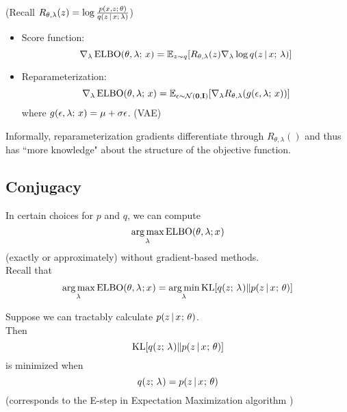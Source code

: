 \begin{frame}
(Recall $R_{\theta, \lambda}(z) = \log \frac{p(x,z ; \, \theta)}{q(z \,|\, x ; \, \lambda)}$)
\begin{itemize}
\item Score function:
\[
    \nabla_\lambda \operatorname*{ELBO}(\theta, \lambda ; \, x) = \mathbb{E}_{z \sim q}[R_{\theta, \lambda}(z) \nabla_\lambda \log q(z \,|\,  x  ; \, \lambda)]
    \]
    \item Reparameterization:
\[
    \nabla_\lambda \operatorname*{ELBO}(\theta, \lambda ; \, x)  = \mathbb{E}_{\epsilon \sim \mathcal{N}(\mathbf{0}, \mathbf{I})}[\nabla_\lambda R_{\theta, \lambda}(g(\epsilon, \lambda ; \, x))]
\]
    where $g(\epsilon, \lambda ; \, x) = \mu + \sigma \epsilon$. (VAE)
\end{itemize}
Informally, reparameterization gradients differentiate through $R_{\theta, \lambda}()$ and thus has ``more knowledge"
about the structure of the objective function.
\end{frame}

\subsection{Conjugacy}


\begin{frame}
In certain choices for $p$ and $q$, we can compute 
\[ \argmax_\lambda \ELBO(\theta, \lambda; x^{}) \]
(exactly or approximately) without gradient-based methods. \\
\air 
\pause
Recall that 
\begin{align*}
     \argmax_{\lambda^{}} \ELBO(\theta, \lambda^{}; x^{}) =   \argmin_{\lambda^{}}  \KL[q(z  \param \lambda^{}) \Vert p(z \given x^{} \param \theta)] 
\end{align*}

\end{frame}

\begin{frame}
Suppose we can tractably calculate $p(z \,|\, x^{} ; \, \theta)$. \\
\pause
Then 
\[  \operatorname*{KL}[q(z ; \, \lambda^{}) \Vert p(z \,|\, x^{} ; \, \theta)]  \]
is minimized when 
\[ q(z ; \, \lambda^{}) = p(z \,|\, x^{} ; \, \theta) \]
(corresponds to the E-step in Expectation Maximization algorithm \citep{dempster77em})
\end{frame}

